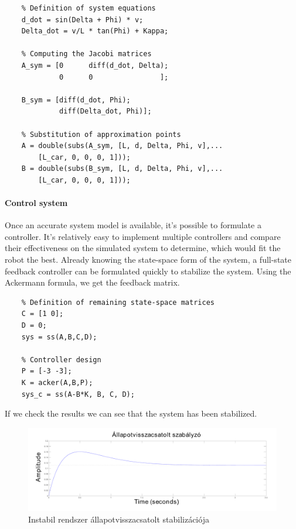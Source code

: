 \begin{lstlisting}
    % Definition of system equations
    d_dot = sin(Delta + Phi) * v;
    Delta_dot = v/L * tan(Phi) + Kappa;
    
    % Computing the Jacobi matrices
    A_sym = [0      diff(d_dot, Delta);
             0      0                ];
       
    B_sym = [diff(d_dot, Phi);
             diff(Delta_dot, Phi)];
    
    % Substitution of approximation points
    A = double(subs(A_sym, [L, d, Delta, Phi, v],...
        [L_car, 0, 0, 0, 1]));
    B = double(subs(B_sym, [L, d, Delta, Phi, v],...
        [L_car, 0, 0, 0, 1]));
\end{lstlisting}

\paragraph{Control system}

Once an accurate system model is available, it's possible to formulate a controller. It's relatively easy to implement multiple controllers and compare their effectiveness on the simulated system to determine, which would fit the robot the best.
Already knowing the state-space form of the system, a full-state feedback controller can be formulated quickly to stabilize the system. Using the Ackermann formula, we get the feedback matrix.

\begin{lstlisting}
    % Definition of remaining state-space matrices
    C = [1 0];
    D = 0;
    sys = ss(A,B,C,D);
    
    % Controller design
    P = [-3 -3];
    K = acker(A,B,P);
    sys_c = ss(A-B*K, B, C, D);
\end{lstlisting}

If we check the results we can see that the system has been stabilized.

\begin{figure}[!ht]
    \centering
    \includegraphics[width=\linewidth]{img/plot2}
    \caption{Instabil rendszer állapotvisszacsatolt stabilizációja}
    \label{fig:plot2}
\end{figure}

